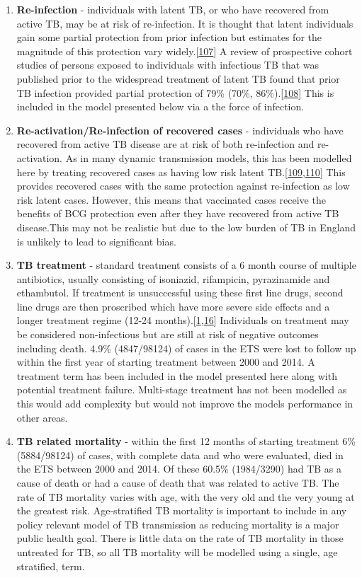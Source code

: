 \documentclass[11pt,twoside]{bristolthesis}
\begin{document}
\begin{enumerate}
  \item
    \textbf{Re-infection} - individuals with latent TB, or who have recovered from active TB, may be at risk of re-infection. It is thought that latent individuals gain some partial protection from prior infection but estimates for the magnitude of this protection vary widely.{[}\protect\hyperlink{ref-Houben2016}{107}{]} A review of prospective cohort studies of persons exposed to individuals with infectious TB that was published prior to the widespread treatment of latent TB found that prior TB infection provided partial protection of 79\% (70\%, 86\%).{[}\protect\hyperlink{ref-Andrews2012}{108}{]} This is included in the model presented below via a the force of infection.
  \item
    \textbf{Re-activation/Re-infection of recovered cases} - individuals who have recovered from active TB disease are at risk of both re-infection and re-activation. As in many dynamic transmission models, this has been modelled here by treating recovered cases as having low risk latent TB.{[}\protect\hyperlink{ref-Vynnycky1997}{109},\protect\hyperlink{ref-Houben2016a}{110}{]} This provides recovered cases with the same protection against re-infection as low risk latent cases. However, this means that vaccinated cases receive the benefits of BCG protection even after they have recovered from active TB disease.This may not be realistic but due to the low burden of TB in England is unlikely to lead to significant bias.
  \item
    \textbf{TB treatment} - standard treatment consists of a 6 month course of multiple antibiotics, usually consisting of isoniazid, rifampicin, pyrazinamide and ethambutol. If treatment is unsuccessful using these first line drugs, second line drugs are then proscribed which have more severe side effects and a longer treatment regime (12-24 months).{[}\protect\hyperlink{ref-PHE2017}{1},\protect\hyperlink{ref-WHOTB2016}{16}{]} Individuals on treatment may be considered non-infectious but are still at risk of negative outcomes including death. 4.9\% (4847/98124) of cases in the ETS were lost to follow up within the first year of starting treatment between 2000 and 2014. A treatment term has been included in the model presented here along with potential treatment failure. Multi-stage treatment has not been modelled as this would add complexity but would not improve the models performance in other areas.
  \item
    \textbf{TB related mortality} - within the first 12 months of starting treatment 6\% (5884/98124) of cases, with complete data and who were evaluated, died in the ETS between 2000 and 2014. Of these 60.5\% (1984/3290) had TB as a cause of death or had a cause of death that was related to active TB. The rate of TB mortality varies with age, with the very old and the very young at the greatest risk. Age-stratified TB mortality is important to include in any policy relevant model of TB transmission as reducing mortality is a major public health goal. There is little data on the rate of TB mortality in those untreated for TB, so all TB mortality will be modelled using a single, age stratified, term.

\end{enumerate}
\end{document}
